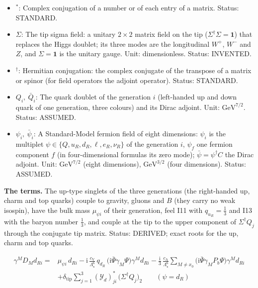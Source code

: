 \documentclass[
  10pt,
]{article}
\begin{document}
\begin{itemize}
  \(\mathcal{K}\) (the normalisation of that relation is not fixed:
  OPEN). Unit: dimensionless. Status: INVENTED.
\item
  \({}^*\): Complex conjugation of a number or of each entry of a
  matrix. Status: STANDARD.
\item
  \(\Sigma\): The tip sigma field: a unitary \(2 \times 2\) matrix field
  on the tip (\(\Sigma^\dagger\Sigma = \mathbf{1}\)) that replaces the
  Higgs doublet; its three modes are the longitudinal \(W^+\), \(W^-\)
  and \(Z\), and \(\Sigma = \mathbf{1}\) is the unitary gauge. Unit:
  dimensionless. Status: INVENTED.
\item
  \({}^\dagger\): Hermitian conjugation: the complex conjugate of the
  transpose of a matrix or spinor (for field operators the adjoint
  operator). Status: STANDARD.
\item
  \(Q_i,\ \bar Q_i\): The quark doublet of the generation \(i\)
  (left-handed up and down quark of one generation, three colours) and
  its Dirac adjoint. Unit: \(\mathrm{GeV}^{7/2}\). Status: ASSUMED.
\item
  \(\psi_i,\ \bar\psi_i\): A Standard-Model fermion field of eight
  dimensions: \(\psi_i\) is the multiplet
  \(\psi \in \{Q, u_R, d_R, \ell, e_R, \nu_R\}\) of the generation
  \(i\), \(\psi_f\) one fermion component \(f\) (in four-dimensional
  formulas its zero mode); \(\bar\psi = \psi^\dagger C\) the Dirac
  adjoint. Unit: \(\mathrm{GeV}^{7/2}\) (eight dimensions),
  \(\mathrm{GeV}^{3/2}\) (four dimensions). Status: ASSUMED.
\end{itemize}

\textbf{The terms.} The up-type singlets of the three generations (the
right-handed up, charm and top quarks) couple to gravity, gluons and
\(B\) (they carry no weak isospin), have the bulk mass \(\mu_{\psi i}\)
of their generation, feel I11 with \(q_{u_R} = \frac13\) and I13 with
the baryon number \(\frac13\), and couple at the tip to the upper
component of \(\Sigma^\dagger Q_j\) through the conjugate tip matrix.
Status: DERIVED; exact roots for the up, charm and top quarks.

\[
\begin{aligned}
\gamma^MD_Md_{Ri} ={}& \mu_{\psi i}\,d_{Ri} - \mathrm{i}\,\frac{c_{\mathrm{V}}}{\Lambda_\star^6}\,q_{d_R}\,
 \big(\mathrm{i}\bar\Psi\gamma_M\Psi\big)\gamma^Md_{Ri}
 - \frac{\mathrm{i}}{3}\,\frac{c_{\mathrm{A}}}{\Lambda_\star^6}\sum_{M\ne
 x_0}\big(\mathrm{i}\bar\Psi\gamma_MP_b\Psi\big)\gamma^Md_{Ri}\\
 &+ \delta_{\mathrm{tip}}\sum_{j=1}^{3}(\mathcal{Y}_d)^*_{ji}\,\big(\Sigma^\dagger Q_j\big)_2\qquad
 (\psi = d_R)
\end{aligned} \tag{FE-16}
\]
\end{document}
